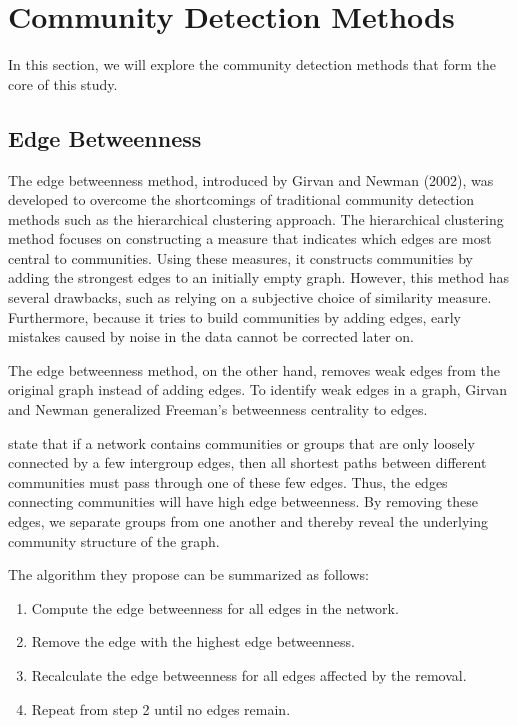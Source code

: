 \section{Community Detection Methods}

In this section, we will explore the community detection methods that form
the core of this study.

\subsection{Edge Betweenness}

The edge betweenness method, introduced by Girvan and Newman (2002),
was developed to overcome the shortcomings of traditional community detection methods such as 
the hierarchical clustering approach. The hierarchical clustering method focuses on 
constructing a measure that indicates which edges are most central to communities.
Using these measures, it constructs communities by adding the strongest edges
to an initially empty graph. However, this method has several drawbacks,
such as relying on a subjective choice of similarity measure.
Furthermore, because it tries to build communities by adding edges,
early mistakes caused by noise in the data cannot be corrected later on.

The edge betweenness method, on the other hand, removes weak edges from the 
original graph instead of adding edges.
To identify weak edges in a graph, Girvan and Newman generalized Freeman's betweenness centrality
to edges.

\textcite{newmanandgirvan2002} state that if a network contains communities
or groups that are only loosely connected by a few intergroup edges, then all shortest paths
between different communities must pass through one of these few edges. Thus, the edges connecting
communities will have high edge betweenness. By removing these edges, we separate groups
from one another and thereby reveal the underlying community structure of the graph.

The algorithm they propose can be summarized as follows:

\begin{enumerate}
  \item Compute the edge betweenness for all edges in the network.
  \item Remove the edge with the highest edge betweenness.
  \item Recalculate the edge betweenness for all edges affected by the removal.
  \item Repeat from step 2 until no edges remain.
\end{enumerate}

